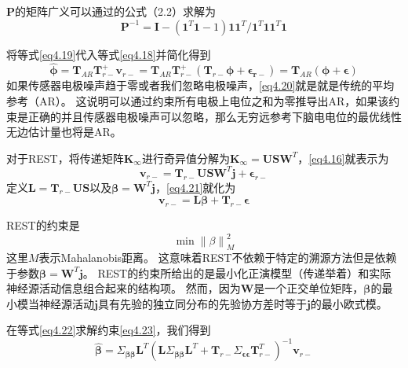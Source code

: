 $\mathbf{P}$的矩阵广义可以通过\cite{baksalary_revisitation_2003}的公式（2.2）求解为
\begin{equation}\label{eq4.19}
\mathbf{P}^{-1}=\mathbf{I}-(\mathbf{1}^T\mathbf{1}-1)\mathbf{11}^T/{\mathbf{1}^T\mathbf{11}^T\mathbf{1}}
\end{equation}

将等式\eqref{eq4.19}代入等式\eqref{eq4.18}并简化得到
\begin{equation}\label{eq4.20}
\hat{\mathbf{\phi}}=\mathbf{T}_{AR}\mathbf{T}_{r-}^+\mathbf{v}_{r-}=\mathbf{T}_{AR}\mathbf{T}_{r-}^+(\mathbf{T}_{r-}\mathbf{\phi}+\mathbf{\epsilon_{r-}})=\mathbf{T}_{AR}(\mathbf{\phi}+\mathbf{\epsilon})
\end{equation}
如果传感器电极噪声趋于零或者我们忽略电极噪声，\eqref{eq4.20}就是就是传统的平均参考（AR）。 这说明可以通过约束所有电极上电位之和为零推导出AR，如果该约束是正确的并且传感器电极噪声可以忽略，那么无穷远参考下脑电电位的最优线性无边估计量也将是AR。

对于REST，将传递矩阵$\mathbf{K}_{\infty}$进行奇异值分解为$\mathbf{K}_{\infty}=\mathbf{USW}^T$，\eqref{eq4.16}就表示为
\begin{equation}\label{eq4.21}
\mathbf{v}_{r-}=\mathbf{T}_{r-}\mathbf{USW}^T\mathbf{j}+\mathbf{\epsilon}_{r-}
\end{equation}
定义$\mathbf{L}=\mathbf{T}_{r-}\mathbf{US}$以及$\mathbf{\beta}=\mathbf{W}^T\mathbf{j}$，\eqref{eq4.21}就化为
\begin{equation}\label{eq4.22}
\mathbf{v}_{r-}=\mathbf{L\beta}+\mathbf{T}_{r-}\mathbf{\epsilon}
\end{equation}

REST的约束是
\begin{equation}\label{eq4.23}
\min{\lVert{\beta}\rVert}_M^2
\end{equation}
这里$M$表示Mahalanobis距离。 这意味着REST不依赖于特定的溯源方法但是依赖于参数$\mathbf{\beta}=\mathbf{W}^T\mathbf{j}$。 REST的约束所给出的是最小化正演模型（传递举着）和实际神经源活动信息组合起来的结构项。 然而，因为$\mathbf{W}$是一个正交单位矩阵，$\mathbf{\beta}$的最小模当神经源活动$\mathbf{j}$具有先验的独立同分布的先验协方差时等于$\mathbf{j}$的最小欧式模。

在等式\eqref{eq4.22}求解约束\eqref{eq4.23}，我们得到
\begin{equation}\label{eq4.24}
\hat{\mathbf{\beta}}=\Sigma_{\mathbf{\beta\beta}}\mathbf{L}^T(\mathbf{L}\Sigma_\mathbf{\beta\beta}\mathbf{L}^T+\mathbf{T}_{r-}\Sigma_{\mathbf{\epsilon\epsilon}}\mathbf{T}_{r-}^T)^{-1}\mathbf{v}_{r-}
\end{equation}

